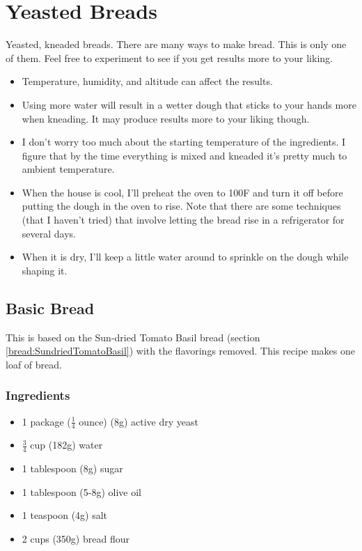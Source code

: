 \documentclass[10pt, openany]{book}
\begin{document}
\chapter{Yeasted Breads}
Yeasted, kneaded breads.  There are many ways to make bread.  This is only one of them.  Feel free to experiment to see if you get results more to your liking.
\begin{itemize}
  \item Temperature, humidity, and altitude can affect the results.
  \item Using more water will result in a wetter dough that sticks to your hands more when kneading.  It may produce results more to your liking though.
  \item I don't worry too much about the starting temperature of the ingredients.  I figure that by the time everything is mixed and kneaded it's pretty much to ambient temperature.
  \item When the house is cool, I'll preheat the oven to 100\degree{}F and turn it off before putting the dough in the oven to rise.  Note that there are some techniques (that I haven't tried) that involve letting the bread rise in a refrigerator for several days.
  \item When it is dry, I'll keep a little water around to sprinkle on the dough while shaping it.
\end{itemize}

\section{Basic Bread}
\label{bread:Basic}
This is based on the Sun-dried Tomato Basil bread (section \ref{bread:SundriedTomatoBasil}) with the flavorings removed.  This recipe makes one loaf of bread.

\subsection{Ingredients}
\begin{itemize}
  \item 1 package ($\frac{1}{4}$ ounce) (8g) active dry yeast
  \item $\frac{3}{4}$ cup (182g) water
  \item 1 tablespoon (8g) sugar
  \item 1 tablespoon (5-8g) olive oil
  \item 1 teaspoon (4g) salt
  \item 2 cups (350g) bread flour
\end{itemize}
\end{document}
